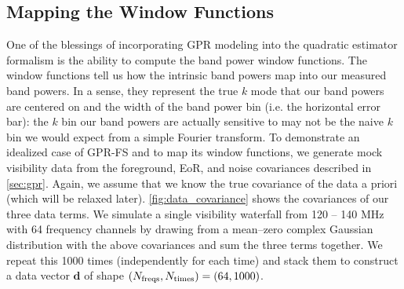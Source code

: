 \documentclass[a4paper,fleqn,usenatbib]{mnras}
\def\d{\boldsymbol{d}}
\begin{document}
\subsection{Mapping the Window Functions}
\label{sec:gpr_windows}

One of the blessings of incorporating GPR modeling into the quadratic estimator formalism is the ability to compute the band power window functions.
The window functions tell us how the intrinsic band powers map into our measured band powers.
In a sense, they represent the true $k$ mode that our band powers are centered on and the width of the band power bin (i.e. the horizontal error bar): the $k$ bin our band powers are actually sensitive to may not be the naive $k$ bin we would expect from a simple Fourier transform.
To demonstrate an idealized case of GPR-FS and to map its window functions, we generate mock visibility data from the foreground, EoR, and noise covariances described in \autoref{sec:gpr}.
Again, we assume that we know the true covariance of the data a priori (which will be relaxed later).
\autoref{fig:data_covariance} shows the covariances of our three data terms.
We simulate a single visibility waterfall from 120 -- 140 MHz with 64 frequency channels by drawing from a mean--zero complex Gaussian distribution with the above covariances and sum the three terms together.
We repeat this 1000 times (independently for each time) and stack them to construct a data vector $\d$ of shape $(N_{\rm freqs}, N_{\rm times}) = (64, 1000)$.
\end{document}
